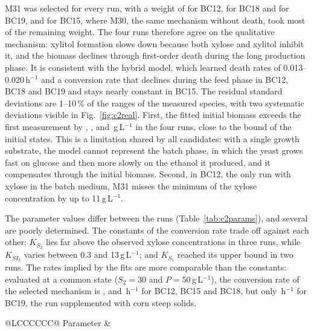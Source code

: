 M31 was selected for every run, with a weight of \BCtwelveW{} for BC12, \BCeighteenW{} for BC18 and \BCnineteenW{} for BC19, and \BCfifteenW{} for BC15, where M30, the same mechanism without death, took most of the remaining weight. The four runs therefore agree on the qualitative mechanism: xylitol formation slows down because both xylose and xylitol inhibit it, and the biomass declines through first-order death during the long production phase. It is consistent with the hybrid model, which learned death rates of 0.013--0.020\,h$^{-1}$ and a conversion rate that declines during the feed phase in BC12, BC18 and BC19 and stays nearly constant in BC15. The residual standard deviations are 1--10\,\% of the ranges of the measured species, with two systematic deviations visible in Fig.~\ref{fig:c2real}. First, the fitted initial biomass exceeds the first measurement by \BCtwelveDXzero, \BCfifteenDXzero, \BCeighteenDXzero{} and \BCnineteenDXzero\,g\,L$^{-1}$ in the four runs, close to the bound of the initial states. This is a limitation shared by all candidates: with a single growth substrate, the model cannot represent the batch phase, in which the yeast grows fast on glucose and then more slowly on the ethanol it produced, and it compensates through the initial biomass. Second, in BC12, the only run with xylose in the batch medium, M31 misses the minimum of the xylose concentration by up to 11\,g\,L$^{-1}$.

The parameter values differ between the runs (Table~\ref{tab:c2params}), and several are poorly determined. The constants of the conversion rate trade off against each other: $K_{S_2}$ lies far above the observed xylose concentrations in three runs, while $K_{SI_2}$ varies between 0.3 and 13\,g\,L$^{-1}$; and $K_{S_1}$ reached its upper bound in two runs. The rates implied by the fits are more comparable than the constants: evaluated at a common state ($S_2=30$ and $P=50$\,g\,L$^{-1}$), the conversion rate of the selected mechanism is \BCtwelveMuRef, \BCfifteenMuRef{} and \BCeighteenMuRef\,h$^{-1}$ for BC12, BC15 and BC18, but only \BCnineteenMuRef\,h$^{-1}$ for BC19, the run supplemented with corn steep solids.

\begin{table}[width=\textwidth,cols=7,pos=t]
\caption{Case study 2: parameters of M31 fitted to each real run alone and to groups of runs jointly with shared parameters.}\label{tab:c2params}
\begin{tabular*}{\tblwidth}{@{}LCCCCCC@{}}
\toprule
Parameter &  \\
\midrule
{}
\bottomrule
\end{tabular*}
\end{table}

